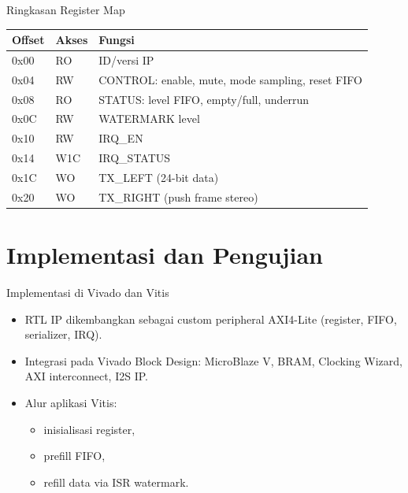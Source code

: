 \documentclass[aspectratio=169]{beamer}
\begin{document}
\begin{frame}{Ringkasan Register Map}
  \small
  \begin{tabular}{>{\ttfamily}p{1.3cm} p{1.2cm} p{7.2cm}}
    \toprule
    Offset & Akses & Fungsi \\
    \midrule
    0x00 & RO & ID/versi IP \\
    0x04 & RW & CONTROL: enable, mute, mode sampling, reset FIFO \\
    0x08 & RO & STATUS: level FIFO, empty/full, underrun \\
    0x0C & RW & WATERMARK level \\
    0x10 & RW & IRQ\_EN \\
    0x14 & W1C & IRQ\_STATUS \\
    0x1C & WO & TX\_LEFT (24-bit data) \\
    0x20 & WO & TX\_RIGHT (push frame stereo) \\
    \bottomrule
  \end{tabular}
\end{frame}

\section{Implementasi dan Pengujian}

\begin{frame}{Implementasi di Vivado dan Vitis}
  \begin{itemize}
    \item RTL IP dikembangkan sebagai custom peripheral AXI4-Lite (register, FIFO, serializer, IRQ).
    \item Integrasi pada Vivado Block Design: MicroBlaze V, BRAM, Clocking Wizard, AXI interconnect, I2S IP.
    \item Alur aplikasi Vitis:
      \begin{itemize}
        \item inisialisasi register,
        \item prefill FIFO,
        \item refill data via ISR watermark.
      \end{itemize}
  \end{itemize}
\end{frame}
\end{document}
